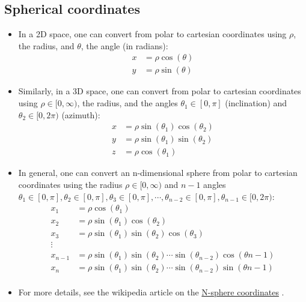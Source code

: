 \documentclass[14pt]{extarticle}
\begin{document}
\begin{appendices}

\section{Spherical coordinates}

\begin{itemize}

\item In a 2D space, one can convert from polar to cartesian coordinates using $\rho$, the radius, and $\theta$, the angle (in radians):                
\begin{align*}
x &= \rho \cos(\theta) \\
y &= \rho \sin(\theta)
\end{align*}

\item Similarly, in a 3D space, one can convert from polar to cartesian coordinates using $\rho \in [0,\infty)$, the radius, and the angles $\theta_1 \in [0,\pi]$ (inclination) and $\theta_2 \in [0,2\pi)$ (azimuth): 
\begin{align*}
x &= \rho \sin(\theta_1) \cos(\theta_2) \\
y &= \rho \sin(\theta_1) \sin(\theta_2) \\
z &= \rho \cos(\theta_1)
\end{align*}

\item In general, one can convert an n-dimensional sphere from polar to cartesian coordinates using the radius $\rho \in [0,\infty)$ and $n-1$ angles $\theta_1 \in [0,\pi],\theta_2 \in [0,\pi],\theta_3 \in [0,\pi], \cdots, \theta_{n-2} \in [0,\pi],\theta_{n-1} \in [0,2\pi)$:
\begin{align*}
x_1 &= \rho \cos(\theta_1) \\
x_2 &= \rho \sin(\theta_1) \cos(\theta_2) \\
x_3 &= \rho \sin(\theta_1) \sin(\theta_2) \cos(\theta_3)\\
\vdots \\
x_{n-1} &= \rho \sin(\theta_1) \sin(\theta_2) \cdots \sin(\theta_{n-2}) \cos(\theta{n-1})\\
x_n &= \rho \sin(\theta_1) \sin(\theta_2) \cdots \sin(\theta_{n-2}) \sin(\theta{n-1})\\
\end{align*}

\item For more details, see the wikipedia article on the \href{https://en.wikipedia.org/wiki/N-sphere#Spherical_coordinates}{N-sphere coordinates} \cite{enwiki:1018020627}.

\end{itemize}											                                                                                                            
\end{appendices} 



\end{document}
